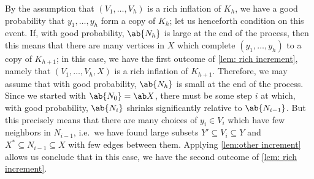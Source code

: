 By the assumption that $(V_1,\dots,V_h)$ is a rich inflation of $K_h$, we have a good probability that $y_1,\dots,y_h$ form a copy of $K_h$; let us henceforth condition on this event. If, with good probability, $\ab{N_h}$ is large at the end of the process, then this means that there are many vertices in $X$ which complete $(y_1,\dots,y_h)$ to a copy of $K_{h+1}$; in this case, we have the first outcome of \cref{lem: rich increment}, namely that $(V_1,\dots,V_h,X)$ is a rich inflation of $K_{h+1}$. Therefore, we may assume that with good probability, $\ab{N_h}$ is small at the end of the process. Since we started with $\ab{N_0}=\ab X$, there must be some step $i$ at which, with good probability, $\ab{N_i}$ shrinks significantly relative to $\ab{N_{i-1}}$. But this precisely means that there are many choices of $y_i \in V_i$ which have few neighbors in $N_{i-1}$, i.e.\ we have found large subsets $Y' \subseteq V_i\subseteq Y$ and $X^* \subseteq N_{i-1}\subseteq X$ with few edges between them. Applying \cref{lem:other increment} allows us conclude that in this case, we have the second outcome of \cref{lem: rich increment}.


